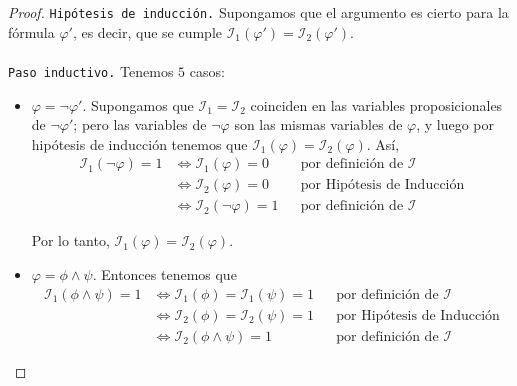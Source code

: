 \documentclass[letterpaper,11pt]{article}
\begin{document}
\begin{proof}
        \justify
        \texttt{Hipótesis de inducción.} Supongamos que el argumento es cierto
        para la fórmula $\varphi '$, es decir, que se cumple 
        $\mathcal{I}_{1}(\varphi ') = \mathcal{I}_{2}(\varphi ')$. \\ \\
        \texttt{Paso inductivo.} Tenemos $5$ casos:
        \begin{itemize}
            \item $\varphi = \neg \varphi '$. Supongamos que 
            $\mathcal{I}_{1} = \mathcal{I}_{2}$ coinciden en las variables
            proposicionales de $\neg \varphi '$; pero las variables de 
            $\neg \varphi$ son las mismas variables de $\varphi$, y luego 
            por hipótesis de inducción tenemos que 
            $\mathcal{I}_{1}(\varphi) = \mathcal{I}_{2}(\varphi)$. Así, 
            \begin{align*}
                \mathcal{I}_{1}(\neg \varphi) = 1 
                &\Leftrightarrow \mathcal{I}_{1}(\varphi) = 0
                && \text{por definición de $\mathcal{I}$} \\
                &\Leftrightarrow \mathcal{I}_{2}(\varphi) = 0
                && \text{por Hipótesis de Inducción} \\
                &\Leftrightarrow \mathcal{I}_{2}(\neg \varphi) = 1
                && \text{por definición de $\mathcal{I}$}
            \end{align*}

            Por lo tanto, 
            $\mathcal{I}_{1}(\varphi) = \mathcal{I}_{2}(\varphi)$.

            \item $\varphi = \phi \land \psi$. Entonces tenemos que
            \begin{align*}
                \mathcal{I}_{1}(\phi \land \psi) = 1
                &\Leftrightarrow \mathcal{I}_{1}(\phi) = \mathcal{I}_{1}(\psi)
                = 1
                && \text{por definición de $\mathcal{I}$} \\
                &\Leftrightarrow \mathcal{I}_{2}(\phi) = \mathcal{I}_{2}(\psi)
                = 1
                && \text{por Hipótesis de Inducción} \\
                &\Leftrightarrow \mathcal{I}_{2}(\phi \land \psi) = 1
                && \text{por definición de $\mathcal{I}$}
            \end{align*}


\end{itemize}
\end{proof}
\end{document}
